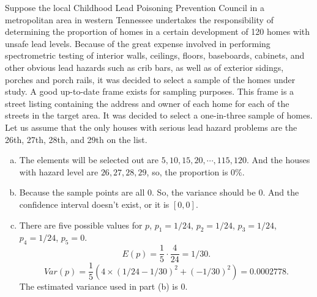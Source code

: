 \documentclass[12pt]{article}
\begin{document}
    \begin{exercise}[Exercise 4.1]
        Suppose the local Childhood Lead Poisoning Prevention Council in a metropolitan area in western Tennessee undertakes the responsibility of determining the proportion of homes in a certain development of 120 homes with unsafe lead levels. Because of the great expense involved in performing spectrometric testing of interior walls, ceilings, floors, baseboards, cabinets, and other obvious lead hazards such as crib bars, as well as of exterior sidings, porches and porch rails, it was decided to select a sample of the homes under study. A good up-to-date frame exists for sampling purposes. This frame is a street listing containing the address and owner of each home for each of the streets in the target area. It was decided to select a one-in-three sample of homes. Let us assume that the only houses with serious lead hazard problems are the 26th, 27th, 28th, and 29th on the list. 
    \end{exercise}

    \begin{solution}
        \begin{enumerate}[a.]
            \item The elements will be selected out are $5, 10, 15, 20, \cdots, 115, 120$. And the houses with hazard level are $26, 27, 28, 29$, so, the proportion is $0\%$. 
            \item Because the sample points are all $0$. So, the variance should be $0$. And the confidence interval doesn't exist, or it is $[0,0]$. 
            \item There are five possible values for $p$, $p_1=1/24$, $p_2=1/24$, $p_3=1/24$, $p_4=1/24$, $p_5=0$. 
            \[
                E(p)=\frac{1}{5}\cdot\frac{4}{24}=1/30. 
            \]
            \[
                Var(p)=\frac{1}{5}(4\times(1/24-1/30)^2+(-1/30)^2)=0.0002778. 
            \]
            The estimated variance used in part (b) is $0$. 
        \end{enumerate}
    \end{solution}
\end{document}
